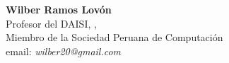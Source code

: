 \begin{center}
\textbf{Wilber Ramos Lovón}\\
Profesor del DAISI, \University, \city\\
Miembro de la Sociedad Peruana de Computación\\
email: \textit{wilber20@gmail.com}
\end{center}
